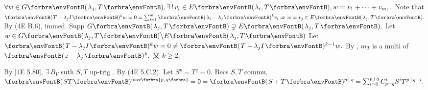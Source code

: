 $\forall w\in G\Par{\lambda_j,T},\exists\,!\,v_i\in E\Par{\lambda_i,T},w=v_1+\dots+v_m,.$\parSol{}
Note that $\Par{T-\lambda_jI}{^k}w=0=\sum_{i=1}^m\Par{\lambda_i-\lambda_j}{^k}v_i\Rightarrow w=v_j\in E\Par{\lambda_j,T}.$\PfEnd\vspace{3pt}\parSol{}
\Or By (4E B.6), immed. \;\Or Supp $G\Par{\lambda_j,T}\supsetneq E\Par{\lambda_j,T}.$ Let $w\in G\Par{\lambda_j,T}\Backslash E\Par{\lambda_j,T}$\parSol{}
Let $\Par{T-\lambda_jI}{^k}w=0\neq\Par{T-\lambda_jI}{^{k-1}}w.$ By , $m_T$ is a multi of $\Par{z-\lambda_j}{^k}.$ 又 $k\geqslant 2.$\PfEnd
\SepLine

By [4E 5.80], $\exists\,B_V$ suth $S,T$ up-trig . By (4E 5.C.2).\PfEnd\vspace{2pt}\parSol{}
\Or Let $S^p=T^q=0.$ Becs $S,T$ commu, $\Par{ST}{^{\max\!\Bra[\scriptsize]{p,\,q}}}=0=\Par{S+T}{^{p+q}}=\sum_{i=0}^{p+q}\mathC_{p+q}^iS^iT^{p+q-i}.$\PfEndB
\SepLine



